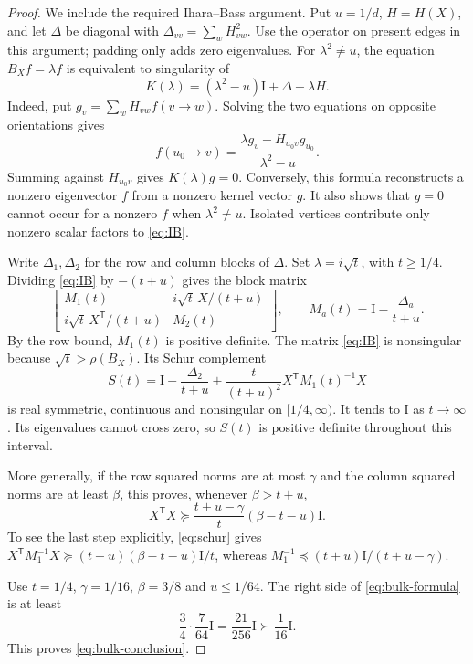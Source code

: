 \documentclass[11pt]{article}
\theoremstyle{definition}
\theoremstyle{remark}
\newcommand{\Id}{\mathrm I}
\begin{document}
\begin{proof}
We include the required Ihara--Bass argument. Put $u=1/d$, $H=H(X)$, and let $\Delta$ be diagonal with $\Delta_{vv}=\sum_wH_{vw}^2$.
Use the operator on present edges in this argument; padding only adds zero eigenvalues. For $\lambda^2\ne u$, the equation $B_Xf=\lambda f$ is equivalent to singularity of
\begin{equation}\label{eq:IB}
 K(\lambda)=(\lambda^2-u)\Id+\Delta-\lambda H.
\end{equation}
Indeed, put $g_v=\sum_wH_{vw}f(v\to w)$. Solving the two equations on opposite orientations gives
\[
 f(u_0\to v)=\frac{\lambda g_v-H_{u_0v}g_{u_0}}{\lambda^2-u}.
\]
Summing against $H_{u_0v}$ gives $K(\lambda)g=0$. Conversely, this formula reconstructs a nonzero eigenvector $f$ from a nonzero kernel vector $g$. It also shows that $g=0$ cannot occur for a nonzero $f$ when $\lambda^2\ne u$. Isolated vertices contribute only nonzero scalar factors to \eqref{eq:IB}.

Write $\Delta_1,\Delta_2$ for the row and column blocks of $\Delta$. Set $\lambda=i\sqrt t$, with $t\geq1/4$. Dividing \eqref{eq:IB} by $-(t+u)$ gives the block matrix
\[
 \begin{bmatrix}
 M_1(t)&i\sqrt t\,X/(t+u)\\
 i\sqrt t\,X^{\mathsf T}/(t+u)&M_2(t)
 \end{bmatrix},
 \qquad
 M_a(t)=\Id-\frac{\Delta_a}{t+u}.
\]
By the row bound, $M_1(t)$ is positive definite. The matrix \eqref{eq:IB} is nonsingular because $\sqrt t>\rho(B_X)$. Its Schur complement
\begin{equation}\label{eq:schur}
 S(t)=\Id-\frac{\Delta_2}{t+u}
       +\frac{t}{(t+u)^2}X^{\mathsf T}M_1(t)^{-1}X
\end{equation}
is real symmetric, continuous and nonsingular on $[1/4,\infty)$. It tends to $\Id$ as $t\to\infty$. Its eigenvalues cannot cross zero, so $S(t)$ is positive definite throughout this interval.

More generally, if the row squared norms are at most $\gamma$ and the column squared norms are at least $\beta$, this proves, whenever $\beta>t+u$,
\begin{equation}\label{eq:bulk-formula}
 X^{\mathsf T}X\succeq
 \frac{t+u-\gamma}{t}(\beta-t-u)\Id.
\end{equation}
To see the last step explicitly, \eqref{eq:schur} gives
$X^{\mathsf T}M_1^{-1}X\succeq(t+u)(\beta-t-u)\Id/t$,
whereas $M_1^{-1}\preceq(t+u)\Id/(t+u-\gamma)$.

Use $t=1/4$, $\gamma=1/16$, $\beta=3/8$ and $u\leq1/64$. The right side of \eqref{eq:bulk-formula} is at least
\[
 \frac34\cdot\frac7{64}\Id=\frac{21}{256}\Id
 \succ\frac1{16}\Id.
\]
This proves \eqref{eq:bulk-conclusion}.
\end{proof}
\end{document}
